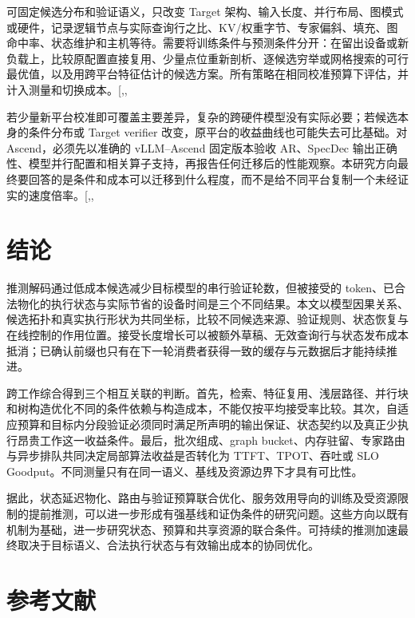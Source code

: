 \documentclass[
  a4paper,
  UTF8,
  fontset=none,
  zihao=5]{ctexart}
\begin{document}
可固定候选分布和验证语义，只改变 Target
架构、输入长度、并行布局、图模式或硬件，记录逻辑节点与实际查询行之比、KV/权重字节、专家偏斜、填充、图命中率、状态维护和主机等待。需要将训练条件与预测条件分开：在留出设备或新负载上，比较原配置直接复用、少量点位重新剖析、逐候选穷举或网格搜索的可行最优值，以及用跨平台特征估计的候选方案。所有策略在相同校准预算下评估，并计入测量和切换成本。{[},,\citeproc{ref-specsearch}{61}{]}

若少量新平台校准即可覆盖主要差异，复杂的跨硬件模型没有实际必要；若候选本身的条件分布或
Target verifier 改变，原平台的收益曲线也可能失去可比基础。对
Ascend，必须先以准确的 vLLM--Ascend 固定版本验收 AR、SpecDec
输出正确性、模型并行配置和相关算子支持，再报告任何迁移后的性能观察。本研究方向最终要回答的是条件和成本可以迁移到什么程度，而不是给不同平台复制一个未经证实的速度倍率。{[},,\citeproc{ref-sequoia}{32}{]}

\section{结论}\label{conclusion}

推测解码通过低成本候选减少目标模型的串行验证轮数，但被接受的
token、已合法物化的执行状态与实际节省的设备时间是三个不同结果。本文以模型因果关系、候选拓扑和真实执行形状为共同坐标，比较不同候选来源、验证规则、状态恢复与在线控制的作用位置。接受长度增长可以被额外草稿、无效查询行与状态发布成本抵消；已确认前缀也只有在下一轮消费者获得一致的缓存与元数据后才能持续推进。

跨工作综合得到三个相互关联的判断。首先，检索、特征复用、浅层路径、并行块和树构造优化不同的条件依赖与构造成本，不能仅按平均接受率比较。其次，自适应预算和目标内分段验证必须同时满足所声明的输出保证、状态契约以及真正少执行昂贵工作这一收益条件。最后，批次组成、graph
bucket、内存驻留、专家路由与异步排队共同决定局部算法收益是否转化为
TTFT、TPOT、吞吐或 SLO
Goodput。不同测量只有在同一语义、基线及资源边界下才具有可比性。

据此，状态延迟物化、路由与验证预算联合优化、服务效用导向的训练及受资源限制的提前推测，可以进一步形成有强基线和证伪条件的研究问题。这些方向以既有机制为基础，进一步研究状态、预算和共享资源的联合条件。可持续的推测加速最终取决于目标语义、合法执行状态与有效输出成本的协同优化。

\section*{参考文献}\label{references}
\end{document}
